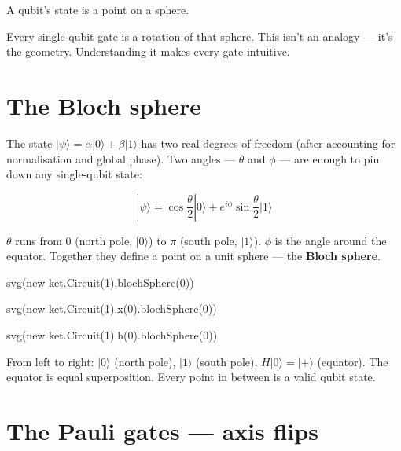 \documentclass[
  11pt,
  letterpaper,
  oneside]{scrbook}
\newenvironment{Shaded}{\begin{snugshade}}{\end{snugshade}}
\newcommand{\NormalTok}[1]{\textcolor[rgb]{0.00,0.23,0.31}{#1}}
\begin{document}
A qubit's state is a point on a sphere.

Every single-qubit gate is a rotation of that sphere. This isn't an
analogy --- it's the geometry. Understanding it makes every gate
intuitive.

\section{The Bloch sphere}\label{the-bloch-sphere}

The state \(|\psi\rangle = \alpha|0\rangle + \beta|1\rangle\) has two
real degrees of freedom (after accounting for normalisation and global
phase). Two angles --- \(\theta\) and \(\phi\) --- are enough to pin
down any single-qubit state:

\[|\psi\rangle = \cos\frac{\theta}{2}|0\rangle + e^{i\phi}\sin\frac{\theta}{2}|1\rangle\]

\(\theta\) runs from 0 (north pole, \(|0\rangle\)) to \(\pi\) (south
pole, \(|1\rangle\)). \(\phi\) is the angle around the equator. Together
they define a point on a unit sphere --- the \textbf{Bloch sphere}.

\begin{Shaded}
\begin{Highlighting}[]
\NormalTok{svg(new ket.Circuit(1).blochSphere(0))}
\end{Highlighting}
\end{Shaded}

\begin{Shaded}
\begin{Highlighting}[]
\NormalTok{svg(new ket.Circuit(1).x(0).blochSphere(0))}
\end{Highlighting}
\end{Shaded}

\begin{Shaded}
\begin{Highlighting}[]
\NormalTok{svg(new ket.Circuit(1).h(0).blochSphere(0))}
\end{Highlighting}
\end{Shaded}

From left to right: \(|0\rangle\) (north pole), \(|1\rangle\) (south
pole), \(H|0\rangle = |{+}\rangle\) (equator). The equator is equal
superposition. Every point in between is a valid qubit state.

\section{The Pauli gates --- axis
flips}\label{the-pauli-gates-axis-flips}
\end{document}
